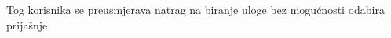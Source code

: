 \begin{packed_item}
\begin{packed_item}
\begin{packed_enum}
								\item Tog korisnika se preusmjerava natrag na biranje uloge bez mogućnosti odabira prijašnje
								
							\end{packed_enum}

						\end{packed_item}
					\end{packed_item}

					


